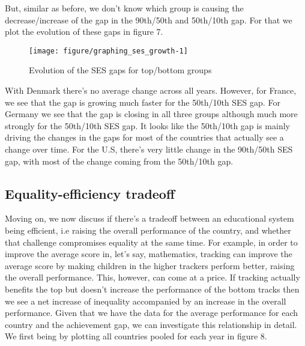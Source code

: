 \documentclass[11pt, a4paper]{article}\usepackage[]{graphicx}\usepackage[]{color}
\begin{document}
But, similar as before, we don't know which group is causing the decrease/increase of the gap in the 90th/50th and 50th/10th gap. For that we plot the evolution of these gaps in figure 7.

\begin{figure}

{\centering \texttt{[image: figure/graphing\_ses\_growth-1]} 

}

\caption[Evolution of the SES gaps for top/bottom groups]{Evolution of the SES gaps for top/bottom groups}\label{fig:graphing_ses_growth}
\end{figure}



With Denmark there's no average change across all years. However, for France, we see that the gap is growing much faster for the 50th/10th SES gap. For Germany we see that the gap is closing in all three groups although much more strongly for the 50th/10th SES gap. It looks like the 50th/10th gap is mainly driving the changes in the gaps for most of the countries that actually see a change over time.  For the U.S, there's very little change in the 90th/50th SES gap, with most of the change coming from the 50th/10th gap.

\subsection{Equality-efficiency tradeoff}

Moving on, we now discuss if there's a tradeoff between an educational system being efficient, i.e raising the overall performance of the country, and whether that challenge compromises equality at the same time. For example, in order to improve the average score in, let's say, mathematics, tracking can improve the average score by making children in the higher trackers perform better, raising the overall performance. This, however, can come at a price. If tracking actually benefits the top but doesn't increase the performance of the bottom tracks then we see a net increase of inequality accompanied by an increase in the overall performance. Given that we have the data for the average performance for each country and the achievement gap, we can investigate this relationship in detail. We first being by plotting all countries pooled for each year in figure 8.
\end{document}
